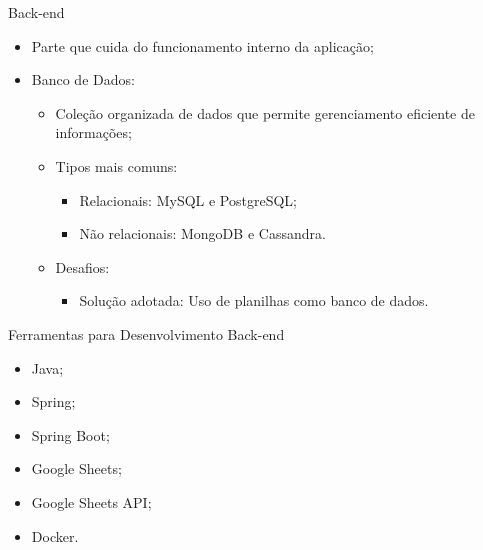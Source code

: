 \begin{frame}{Back-end}
    \begin{itemize}
        \item Parte que cuida do funcionamento interno da aplicação; \vspace{0.25cm}
        \item Banco de Dados: \vspace{0.25cm}
              \begin{itemize}
                  \item Coleção organizada de dados que permite gerenciamento eficiente de informações; \vspace{0.25cm}
                  \item Tipos mais comuns: \vspace{0.25cm}
                        \begin{itemize}
                            \item Relacionais: MySQL e PostgreSQL; \vspace{0.25cm}
                            \item Não relacionais: MongoDB e Cassandra. \vspace{0.25cm}
                        \end{itemize}
                  \item Desafios: \vspace{0.25cm}
                        \begin{itemize}
                            \item Solução adotada: Uso de planilhas como banco de dados. \vspace{0.25cm}
                        \end{itemize}
              \end{itemize}
    \end{itemize}
\end{frame}

\begin{frame}{Ferramentas para Desenvolvimento Back-end}
    \begin{itemize}
        \item Java; \vspace{0.5cm}
        \item Spring; \vspace{0.5cm}
        \item Spring Boot; \vspace{0.5cm}
        \item Google Sheets; \vspace{0.5cm}
        \item Google Sheets API; \vspace{0.5cm}
        \item Docker. \vspace{0.5cm}
    \end{itemize}
\end{frame}

